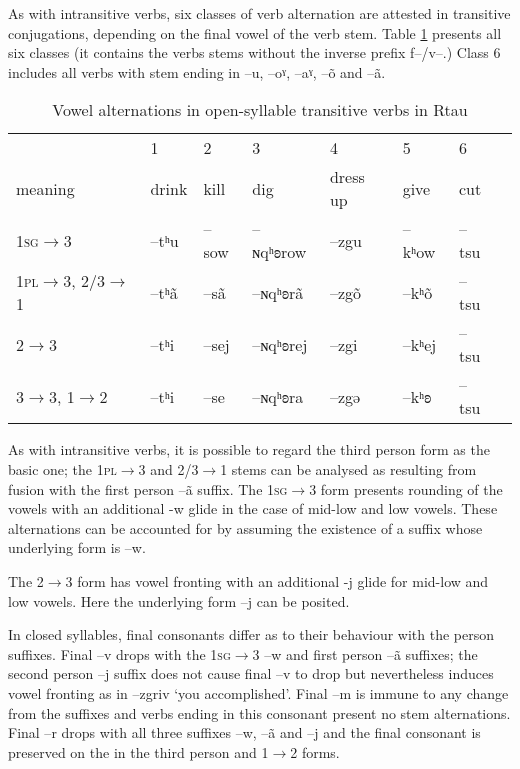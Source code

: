 \documentclass[oneside,a4paper,11pt]{article}
\newcommand{\ipa}[1]{{\phon #1}} %
\begin{document}
As with intransitive verbs, six classes of verb alternation are attested in transitive conjugations, depending on the final vowel of the verb stem. Table \ref{tab:open.tr} presents all six classes (it contains the verbs stems without the inverse prefix \ipa{f}--/\ipa{v}--.) Class 6  includes all verbs with stem ending in --\ipa{u}, --\ipa{oˠ}, --\ipa{aˠ}, --\ipa{õ} and --\ipa{ã}.

\begin{table}[H]
\caption{Vowel alternations in open-syllable transitive verbs in Rtau} \label{tab:open.tr} \centering
\begin{tabular}{llll|ll|ll}
\toprule
&1&2&3&4&5&6 \\
meaning &	drink & kill & dig & dress up & give &cut
\\
\midrule
\textsc{1sg$\rightarrow$3}&	--\ipa{tʰu}&--\ipa{sow}&--\ipa{ɴqʰʚrow}&--\ipa{zgu}&--\ipa{kʰow}&--\ipa{tsu}&
\\
\textsc{1pl$\rightarrow$3}, 2/3$\rightarrow$1& --\ipa{tʰã}&--\ipa{sã}&--\ipa{ɴqʰʚrã}&--\ipa{zgõ}&--\ipa{kʰõ}&--\ipa{tsu}&
\\
2$\rightarrow$3& --\ipa{tʰi}&--\ipa{sej}&--\ipa{ɴqʰʚrej}&--\ipa{zgi}&--\ipa{kʰej}&--\ipa{tsu}&
\\
3$\rightarrow$3, 1$\rightarrow$2&--\ipa{tʰi}&--\ipa{se}&--\ipa{ɴqʰʚra}&--\ipa{zgə}&--\ipa{kʰʚ}&--\ipa{tsu}&
\\
\bottomrule
\end{tabular}
\end{table}
As with intransitive verbs, it is possible to regard the third person form as the basic one; the \textsc{1pl$\rightarrow$3} and 2/3$\rightarrow$1 stems can be analysed as resulting from fusion with the first person --\ipa{ã} suffix. 
The \textsc{1sg$\rightarrow$3} form presents rounding of the vowels with an additional \ipa{-w} glide in the case of mid-low and low vowels. These alternations can be accounted for by assuming the existence of a suffix whose underlying form is \ipa{--w}.

The \textsc{2$\rightarrow$3} form has vowel fronting with an additional \ipa{-j} glide for  mid-low and low vowels. Here the underlying form \ipa{--j} can be posited.

In closed syllables, final consonants differ as to their behaviour with the person suffixes. Final \ipa{--v} drops with the \textsc{1sg$\rightarrow$3} --\ipa{w} and first person --\ipa{ã} suffixes; the second person \ipa{--j} suffix does not cause final --\ipa{v} to drop but nevertheless induces vowel fronting as in --\ipa{zgriv} `you accomplished'. Final --\ipa{m} is immune to any change from the suffixes and verbs ending in this consonant present no stem alternations. Final --\ipa{r} drops with all three suffixes --\ipa{w}, --\ipa{ã} and --\ipa{j} and the final consonant is preserved on the in the third person and 1$\rightarrow$2 forms.
\end{document}
